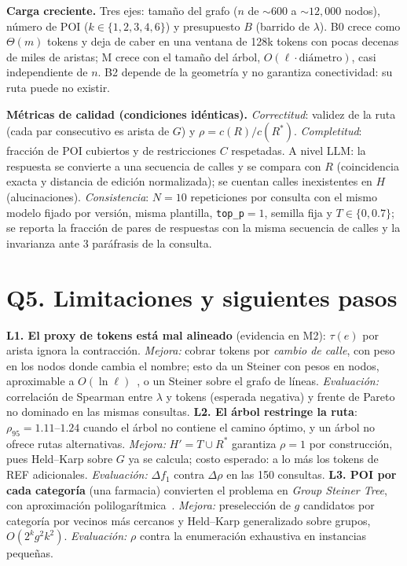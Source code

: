 \documentclass[conference,10pt]{IEEEtran}
\begin{document}
\textbf{Carga creciente.} Tres ejes: tamaño del grafo ($n$ de $\sim\!600$ a $\sim\!12{,}000$ nodos), número de POI ($k\in\{1,2,3,4,6\}$) y presupuesto $B$ (barrido de $\lambda$). B0 crece como $\Theta(m)$ tokens y deja de caber en una ventana de 128k tokens con pocas decenas de miles de aristas; M crece con el tamaño del árbol, $O(\ell\cdot\text{diámetro})$, casi independiente de $n$. B2 depende de la geometría y no garantiza conectividad: su ruta puede no existir.

\textbf{Métricas de calidad (condiciones idénticas).} \emph{Correctitud}: validez de la ruta (cada par consecutivo es arista de $G$) y $\rho=c(R)/c(R^*)$. \emph{Completitud}: fracción de POI cubiertos y de restricciones $C$ respetadas. A nivel LLM: la respuesta se convierte a una secuencia de calles y se compara con $R$ (coincidencia exacta y distancia de edición normalizada); se cuentan calles inexistentes en $H$ (alucinaciones). \emph{Consistencia}: $N=10$ repeticiones por consulta con el mismo modelo fijado por versión, misma plantilla, \texttt{top\_p}$=1$, semilla fija y $T\in\{0,0.7\}$; se reporta la fracción de pares de respuestas con la misma secuencia de calles y la invarianza ante 3 paráfrasis de la consulta.

\section{Q5. Limitaciones y siguientes pasos}
\textbf{L1. El proxy de tokens está mal alineado} (evidencia en M2): $\tau(e)$ por arista ignora la contracción. \emph{Mejora:} cobrar tokens por \emph{cambio de calle}, con peso en los nodos donde cambia el nombre; esto da un Steiner con pesos en nodos, aproximable a $O(\ln\ell)$~\cite{klein1995}, o un Steiner sobre el grafo de líneas. \emph{Evaluación:} correlación de Spearman entre $\lambda$ y tokens (esperada negativa) y frente de Pareto no dominado en las mismas consultas.
\textbf{L2. El árbol restringe la ruta}: $\rho_{95}=1.11$--$1.24$ cuando el árbol no contiene el camino óptimo, y un árbol no ofrece rutas alternativas. \emph{Mejora:} $H'=T\cup R^*$ garantiza $\rho=1$ por construcción, pues Held--Karp sobre $G$ ya se calcula; costo esperado: a lo más los tokens de REF adicionales. \emph{Evaluación:} $\Delta f_1$ contra $\Delta\rho$ en las 150 consultas.
\textbf{L3. POI por cada categoría} (\guillemotleft{}una farmacia\guillemotright{}) convierten el problema en \emph{Group Steiner Tree}, con aproximación polilogarítmica~\cite{garg2000}. \emph{Mejora:} preselección de $g$ candidatos por categoría por vecinos más cercanos y Held--Karp generalizado sobre grupos, $O(2^k g^2k^2)$. \emph{Evaluación:} $\rho$ contra la enumeración exhaustiva en instancias pequeñas.
\end{document}
